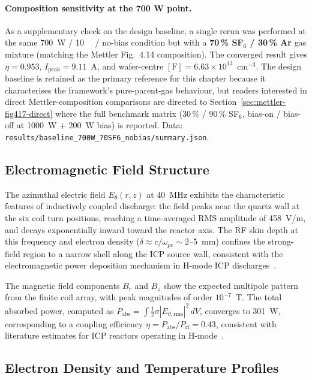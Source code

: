 \documentclass[11pt,a4paper]{report}
\begin{document}
\paragraph{Composition sensitivity at the 700 W point.}  As a supplementary check on the design baseline, a single rerun was performed at the same \SI{700}{\watt} / \SI{10}{\milli\torr} / no-bias condition but with a \textbf{70\,\% SF$_6$ / 30\,\% Ar} gas mixture (matching the Mettler Fig.~4.14 composition).  The converged result gives $\eta = 0.953$, $I_\mathrm{peak} = 9.11$~A, and wafer-centre $[\mathrm{F}] = 6.63 \times 10^{13}$~cm$^{-3}$.  The design baseline is retained as the primary reference for this chapter because it characterises the framework's pure-parent-gas behaviour, but readers interested in direct Mettler-composition comparisons are directed to Section~\ref{sec:mettler-fig417-direct} where the full benchmark matrix (30\,\% / 90\,\% SF$_6$, bias-on / bias-off at \SI{1000}{\watt} + \SI{200}{\watt} bias) is reported.  Data: \texttt{results/baseline\_700W\_70SF6\_nobias/summary.json}.

\subsection{Electromagnetic Field Structure}

The azimuthal electric field $E_\theta(r,z)$ at \SI{40}{\mega\hertz} exhibits the characteristic features of inductively coupled discharge: the field peaks near the quartz wall at the six coil turn positions, reaching a time-averaged RMS amplitude of \SI{458}{\volt/\meter}, and decays exponentially inward toward the reactor axis.  The RF skin depth at this frequency and electron density ($\delta \approx c/\omega_{pe} \sim 2$--\SI{5}{\milli\meter}) confines the strong-field region to a narrow shell along the ICP source wall, consistent with the electromagnetic power deposition mechanism in H-mode ICP discharges~\cite{Lieberman2005}.

The magnetic field components $B_r$ and $B_z$ show the expected multipole pattern from the finite coil array, with peak magnitudes of order $10^{-7}$~T.  The total absorbed power, computed as $P_\mathrm{abs} = \int \frac{1}{2}\sigma|E_{\theta,\mathrm{rms}}|^2\,dV$, converges to \SI{301}{\watt}, corresponding to a coupling efficiency $\eta = P_\mathrm{abs}/P_\mathrm{rf} = 0.43$, consistent with literature estimates for ICP reactors operating in H-mode~\cite{Lieberman2005,Lee1995}.

\subsection{Electron Density and Temperature Profiles}
\end{document}
